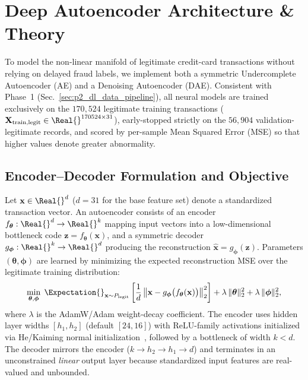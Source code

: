 
\section{Deep Autoencoder Architecture \& Theory}
\label{sec:p2_architecture}

To model the non-linear manifold of legitimate credit-card transactions without
relying on delayed fraud labels, we implement both a symmetric Undercomplete
Autoencoder (AE) and a Denoising Autoencoder (DAE).  Consistent with Phase~1
(Sec.~\ref{sec:p2_dl_data_pipeline}), all neural models are trained
exclusively on the $170{,}524$ legitimate training transactions
($\mathbf{X}_{\text{train,legit}} \in \Real{}^{170524 \times 31}$),
early-stopped strictly on the $56{,}904$ validation-legitimate records, and
scored by per-sample Mean Squared Error (MSE) so that higher values denote
greater abnormality.

\subsection{Encoder--Decoder Formulation and Objective}
\label{sec:ae_formulation}

Let $\mathbf{x} \in \Real{}^{d}$ ($d = 31$ for the base feature set) denote
a standardized transaction vector.  An autoencoder consists of an encoder
$f_{\boldsymbol{\theta}} : \Real{}^{d} \to \Real{}^{k}$ mapping input
vectors into a low-dimensional bottleneck code
$\mathbf{z} = f_{\boldsymbol{\theta}}(\mathbf{x})$, and a symmetric decoder
$g_{\boldsymbol{\phi}} : \Real{}^{k} \to \Real{}^{d}$ producing the
reconstruction $\hat{\mathbf{x}} = g_{\boldsymbol{\phi}}(\mathbf{z})$.
Parameters $(\boldsymbol{\theta}, \boldsymbol{\phi})$ are learned by minimizing
the expected reconstruction MSE over the legitimate training distribution:
\begin{equation}
    \min_{\boldsymbol{\theta}, \boldsymbol{\phi}} \;
    \Expectation{}_{\mathbf{x} \sim P_{\text{legit}}}
    \left[ \frac{1}{d} \, \bigl\| \mathbf{x} - g_{\boldsymbol{\phi}}\bigl(f_{\boldsymbol{\theta}}(\mathbf{x})\bigr) \bigr\|_2^2 \right]
    + \lambda \, \|\boldsymbol{\theta}\|_2^2 + \lambda \, \|\boldsymbol{\phi}\|_2^2,
    \label{eq:ae_objective}
\end{equation}
where $\lambda$ is the AdamW/Adam weight-decay coefficient.  The encoder uses
hidden layer widths $[h_1, h_2]$ (default $[24, 16]$) with ReLU-family
activations initialized via He/Kaiming normal initialization~\cite{he2015delving},
followed by a bottleneck of width $k < d$.  The decoder mirrors the encoder
($k \to h_2 \to h_1 \to d$) and terminates in an unconstrained \emph{linear}
output layer because standardized input features are real-valued and unbounded.

